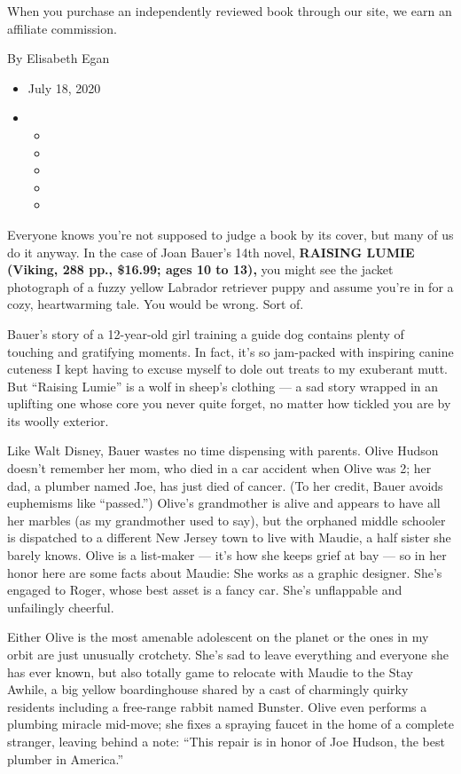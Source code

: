 When you purchase an independently reviewed book through our site, we
earn an affiliate commission.

By Elisabeth Egan

\begin{itemize}
\item
  July 18, 2020
\item
  \begin{itemize}
  \item
  \item
  \item
  \item
  \item
  \end{itemize}
\end{itemize}

Everyone knows you're not supposed to judge a book by its cover, but
many of us do it anyway. In the case of Joan Bauer's 14th novel,
\textbf{RAISING LUMIE (Viking, 288 pp., \$16.99; ages 10 to 13),} you
might see the jacket photograph of a fuzzy yellow Labrador retriever
puppy and assume you're in for a cozy, heartwarming tale. You would be
wrong. Sort of.

Bauer's story of a 12-year-old girl training a guide dog contains plenty
of touching and gratifying moments. In fact, it's so jam-packed with
inspiring canine cuteness I kept having to excuse myself to dole out
treats to my exuberant mutt. But ``Raising Lumie'' is a wolf in sheep's
clothing --- a sad story wrapped in an uplifting one whose core you
never quite forget, no matter how tickled you are by its woolly
exterior.

Like Walt Disney, Bauer wastes no time dispensing with parents. Olive
Hudson doesn't remember her mom, who died in a car accident when Olive
was 2; her dad, a plumber named Joe, has just died of cancer. (To her
credit, Bauer avoids euphemisms like ``passed.'') Olive's grandmother is
alive and appears to have all her marbles (as my grandmother used to
say), but the orphaned middle schooler is dispatched to a different New
Jersey town to live with Maudie, a half sister she barely knows. Olive
is a list-maker --- it's how she keeps grief at bay --- so in her honor
here are some facts about Maudie: She works as a graphic designer. She's
engaged to Roger, whose best asset is a fancy car. She's unflappable and
unfailingly cheerful.

Either Olive is the most amenable adolescent on the planet or the ones
in my orbit are just unusually crotchety. She's sad to leave everything
and everyone she has ever known, but also totally game to relocate with
Maudie to the Stay Awhile, a big yellow boardinghouse shared by a cast
of charmingly quirky residents including a free-range rabbit named
Bunster. Olive even performs a plumbing miracle mid-move; she fixes a
spraying faucet in the home of a complete stranger, leaving behind a
note: ``This repair is in honor of Joe Hudson, the best plumber in
America.''

